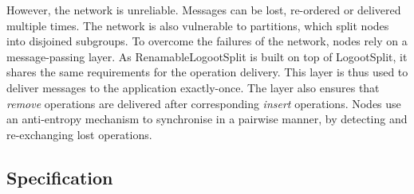 \documentclass{article}
\theoremstyle{definition}
\theoremstyle{definition}
\theoremstyle{definition}
\theoremstyle{definition}
\begin{document}
However, the network is unreliable.
Messages can be lost, re-ordered or delivered multiple times.
The network is also vulnerable to partitions, which split nodes into disjoined subgroups.
To overcome the failures of the network, nodes rely on a message-passing layer.
As RenamableLogootSplit is built on top of LogootSplit, it shares the same requirements for the operation delivery.
This layer is thus used to deliver messages to the application exactly-once.
The layer also ensures that \emph{remove} operations are delivered after corresponding \emph{insert} operations.
Nodes use an anti-entropy mechanism to synchronise in a pairwise manner, by detecting and re-exchanging lost operations.

\subsection{Specification}
\end{document}

